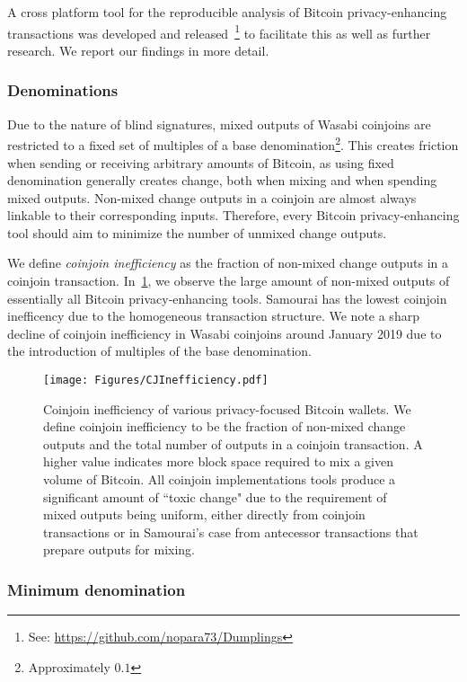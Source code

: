 \documentclass[a4paper]{article}
\def\bitcoinA{%
  \leavevmode
  \vtop{\offinterlineskip %
    \setbox0=\hbox{B}%
    \setbox2=\hbox to\wd0{\hfil\hskip-.03em
    \vrule height .3ex width .15ex\hskip .08em
    \vrule height .3ex width .15ex\hfil}
    \vbox{\copy2\box0}\box2}}
\def\bitcoinA{%
  \leavevmode
  \vtop{\offinterlineskip %
    \setbox0=\hbox{B}%
    \setbox2=\hbox to\wd0{\hfil\hskip-.03em
    \vrule height .3ex width .15ex\hskip .08em
    \vrule height .3ex width .15ex\hfil}
    \vbox{\copy2\box0}\box2}}
\begin{document}
A cross platform tool for the reproducible analysis of Bitcoin privacy-enhancing transactions was developed and released~\footnote{See: \url{https://github.com/nopara73/Dumplings}} to facilitate this as well as further research. We report our findings in more detail.

\subsubsection{Denominations}

Due to the nature of blind signatures, mixed outputs of Wasabi coinjoins are restricted to a fixed set of multiples of a base denomination\footnote{Approximately $0.1$\bitcoinA{}}. This creates friction when sending or receiving arbitrary amounts of Bitcoin, as using fixed denomination generally creates change, both when mixing and when spending mixed outputs. Non-mixed change outputs in a coinjoin are almost always linkable to their corresponding inputs. Therefore, every Bitcoin privacy-enhancing tool should aim to minimize the number of unmixed change outputs.

We define \emph{coinjoin inefficiency} as the fraction of non-mixed change outputs in a coinjoin transaction. In~\cref{fig:cjinefficiency}, we observe the large amount of non-mixed outputs of essentially all Bitcoin privacy-enhancing tools. Samourai has the lowest coinjoin inefficency due to the homogeneous transaction structure. We note a sharp decline of coinjoin inefficiency in Wasabi coinjoins around January 2019 due to the introduction of multiples of the base denomination.

\begin{figure}[h!]
    \centering
    \texttt{[image: Figures/CJInefficiency.pdf]}
    \caption{Coinjoin inefficiency of various privacy-focused Bitcoin wallets. We define coinjoin inefficiency to be the fraction of non-mixed change outputs and the total number of outputs in a coinjoin transaction. A higher value indicates more block space required to mix a given volume of Bitcoin. All coinjoin implementations tools produce a significant amount of ``toxic change" due to the requirement of mixed outputs being uniform, either directly from coinjoin transactions or in Samourai's case from antecessor transactions that prepare outputs for mixing.}
    \label{fig:cjinefficiency}
\end{figure}

\subsubsection{Minimum denomination}
\end{document}
